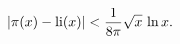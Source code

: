 \[\left|\mathop{\pi\/}\nolimits\!\left(x\right)-\mathop{\mathrm{li}\/}\nolimits%
\!\left(x\right)\right|<\frac{1}{8\pi}\sqrt{x}\,\mathop{\ln\/}\nolimits x.\]